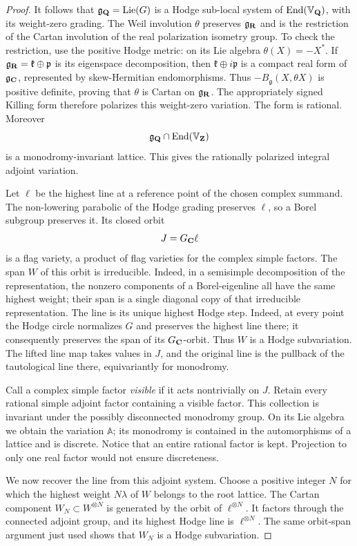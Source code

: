 \begin{proof}
It follows that $\mathfrak g_{\mathbf Q}=\operatorname{Lie}(G)$ is a Hodge
sub-local system of $\operatorname{End}(\mathbb V_{\mathbf Q})$, with its weight-zero
grading.  The Weil involution $\theta$ preserves $\mathfrak g_{\mathbf R}$
and is the restriction of the Cartan involution of the real
polarization isometry group.  To check the restriction, use the
positive Hodge metric: on its Lie algebra $\theta(X)=-X^*$.
If $\mathfrak g_{\mathbf R}=\mathfrak k\oplus\mathfrak p$ is its
eigenspace decomposition, then $\mathfrak k\oplus i\mathfrak p$
is a compact real form of $\mathfrak g_{\mathbf C}$, represented by
skew-Hermitian endomorphisms.  Thus
$-B_{\mathfrak g}(X,\theta X)$ is positive definite, proving that
$\theta$ is Cartan on $\mathfrak g_{\mathbf R}$.  The appropriately
signed Killing form therefore polarizes this weight-zero variation.
The form is rational.  Moreover
\[
          \mathfrak g_{\mathbf Q}\cap\operatorname{End}(\mathbb V_{\mathbf Z})
\]
is a monodromy-invariant lattice.  This gives the rationally polarized
integral adjoint variation.

Let $\ell$ be the highest line at a reference point of the chosen
complex summand.  The non-lowering parabolic of the Hodge grading
preserves $\ell$, so a Borel subgroup preserves it.  Its closed orbit
\[
                       J=G_{\mathbf C}\ell
\]
is a flag variety, a product of flag varieties for the complex simple
factors.  The span $W$ of this orbit is irreducible.  Indeed, in a
semisimple decomposition of the representation, the nonzero
components of a Borel-eigenline all have the same highest weight;
their span is a single diagonal copy of that irreducible
representation.  The line is its unique highest Hodge step.  Indeed, at every point
the Hodge circle normalizes $G$ and preserves the highest line there;
it consequently preserves the span of its $G_{\mathbf C}$-orbit.  Thus $W$
is a Hodge subvariation.  The lifted line map takes values in $J$,
and the original line is the pullback of the tautological line there,
equivariantly for monodromy.

Call a complex simple factor \emph{visible} if it acts nontrivially
on $J$.  Retain every rational simple adjoint factor containing a
visible factor.
This collection is invariant under the possibly disconnected
monodromy group.  On its Lie algebra we obtain the variation
$\mathbb A$; its monodromy is contained in the automorphisms of a
lattice and is discrete.  Notice that an entire rational factor is
kept.  Projection to only one real factor would not ensure
discreteness.

We now recover the line from this adjoint system.  Choose a positive
integer $N$ for which the highest weight $N\lambda$ of $W$ belongs
to the root lattice.  The Cartan component
$W_N\subset W^{\otimes N}$ is generated by the orbit of
$\ell^{\otimes N}$.  It factors through the connected adjoint group,
and its highest Hodge line is $\ell^{\otimes N}$.  The same
orbit-span argument just used shows that $W_N$ is a Hodge
subvariation.


\end{proof}
